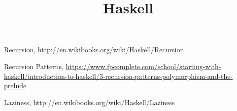 \documentclass{article}
\title{Haskell}
\begin{document}
  \lstset{language=Haskell}
  \maketitle

  



\begin{thebibliography}{3}

  Recursion, \url{http://en.wikibooks.org/wiki/Haskell/Recursion}

  Recursion Patterns,
  \url{https://www.fpcomplete.com/school/starting-with-haskell/introduction-to-haskell/3-recursion-patterns-polymorphism-and-the-prelude}

  Laziness, http://en.wikibooks.org/wiki/Haskell/Laziness

\end{thebibliography}
\end{document}
